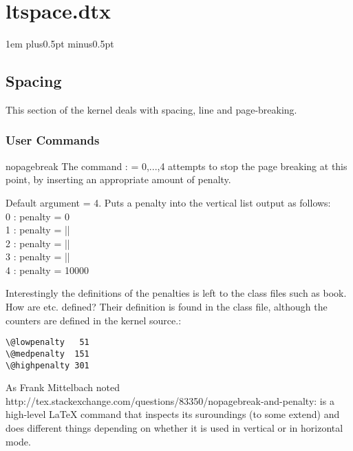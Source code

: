 \chapter{ltspace.dtx}
\label{kernel:ltspace}            

\parindent1em
\parskip3pt plus0.5pt minus0.5pt

 \section{Spacing}

 This section of the \latexe kernel deals with spacing, line and page-breaking.

\subsection{User Commands}
 
\begin{docCommand*}{nopagebreak}{}
The command :  = 0,...,4 attempts to stop the page breaking at this point, by inserting an appropriate amount of penalty. 
\end{docCommand*}

 Default argument = 4.  Puts a penalty into the vertical list
 output as follows:\\
 
                   0 : penalty = 0\\
                   1 : penalty = |\@lowpenalty|\\
                   2 : penalty = |\@medpenalty|\\
                   3 : penalty = |\@highpenalty|\\
                   4 : penalty = 10000

Interestingly the definitions of the penalties is left to the class
files such as book. 
How are  etc. defined? Their definition is found in the class file, although the counters are defined in the kernel source.:

\begin{verbatim}
\@lowpenalty   51
\@medpenalty  151
\@highpenalty 301
\end{verbatim}

As Frank Mittelbach noted {{http://tex.stackexchange.com/questions/83350/nopagebreak-and-penalty}}:
 is a high-level LaTeX command that inspects its suroundings (to some extend) and does different things depending on whether it is used in vertical or in horizontal mode.

